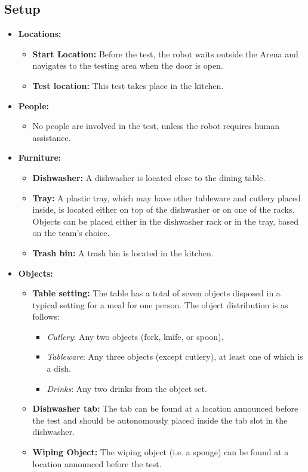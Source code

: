 \subsection*{Setup}
\begin{itemize}[nosep]
	\item \textbf{Locations:}
		\begin{itemize}
			\item \textbf{Start Location:} Before the test, the robot waits outside the Arena and navigates to the testing area when the door is open.
			\item \textbf{Test location:} This test takes place in the kitchen.
		\end{itemize}
	\item \textbf{People:}
		\begin{itemize}
			\item No people are involved in the test, unless the robot requires human assistance.
		\end{itemize}
	\item \textbf{Furniture:}
		\begin{itemize}
			\item \textbf{Dishwasher:} A dishwasher is located close to the dining table.
			\item \textbf{Tray:} A plastic tray, which may have other tableware and cutlery placed inside, is located either on top of the dishwasher or on one of the racks. Objects can be placed either in the dishwasher rack or in the tray, based on the team's choice.
			\item \textbf{Trash bin:} A trash bin is located in the kitchen.
		\end{itemize}
	\item \textbf{Objects:}
		\begin{itemize}
			\item \textbf{Table setting:} The table has a total of seven objects disposed in a typical setting for a meal for one person.
			The object distribution is as follows:
			\begin{itemize}[nosep]
				\item\textit{Cutlery}: Any two objects (fork, knife, or spoon).
				\item\textit{Tableware}: Any three objects (except cutlery), at least one of which is a dish.
				\item\textit{Drinks}: Any two drinks from the object set.
			\end{itemize}
			\item \textbf{Dishwasher tab:} The tab can be found at a location announced before the test and should be autonomously placed inside the tab slot in the dishwasher.
			\item \textbf{Wiping Object:} The wiping object (i.e. a sponge) can be found at a location announced before the test.
		\end{itemize}
\end{itemize}



